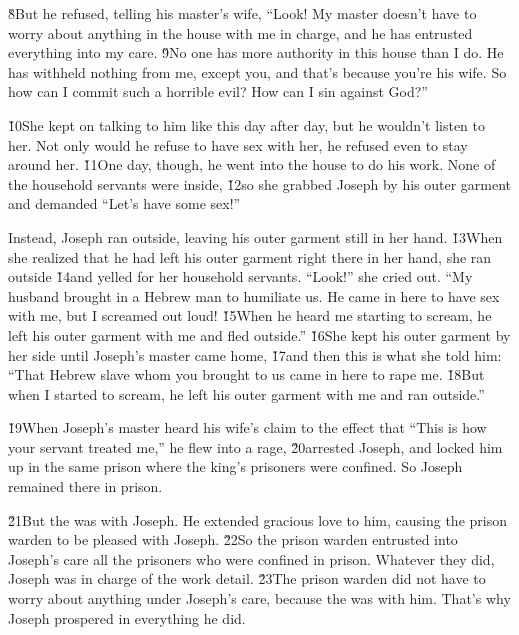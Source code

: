 \v{8}But he refused, telling his master's wife, ``Look! My master doesn't have to worry about anything in the house with me in charge, and he has entrusted everything into my care. \v{9}No one has more authority in this house than I do. He has withheld nothing from me, except you, and that's because you're his wife. So how can I commit such a horrible evil? How can I sin against God?''

\v{10}She kept on talking to him like this day after day, but he wouldn't listen to her. Not only would he refuse to have sex with her, he refused even to stay around her. \v{11}One day, though, he went into the house to do his work. None of the household servants were inside, \v{12}so she grabbed Joseph by his outer garment and demanded ``Let's have some sex!''

Instead, Joseph ran outside, leaving his outer garment still in her hand. \v{13}When she realized that he had left his outer garment right there in her hand, she ran outside \v{14}and yelled for her household servants. ``Look!'' she cried out. ``My husband brought in a Hebrew man to humiliate us. He came in here to have sex with me, but I screamed out loud! \v{15}When he heard me starting to scream, he left his outer garment with me and fled outside.'' \v{16}She kept his outer garment by her side until Joseph's master came home, \v{17}and then this is what she told him: ``That Hebrew slave whom you brought to us came in here to rape me. \v{18}But when I started to scream, he left his outer garment with me and ran outside.''

\v{19}When Joseph's master heard his wife's claim to the effect that ``This is how your servant treated me,'' he flew into a rage, \v{20}arrested Joseph, and locked him up in the same prison where the king's prisoners were confined. So Joseph remained there in prison.

\v{21}But the  was with Joseph. He extended gracious love to him, causing the prison warden to be pleased with Joseph. \v{22}So the prison warden entrusted into Joseph's care all the prisoners who were confined in prison. Whatever they did, Joseph was in charge of the work detail. \v{23}The prison warden did not have to worry about anything under Joseph's care, because the  was with him. That's why Joseph prospered in everything he did.

